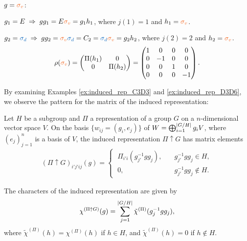 \begin{example}
\n

$g = \sv$:

$g_1 = E \implies g g_1 = E \sv = g_1 h_1$, where $j(1) = 1$ and $h_1 = \sv$.

$g_2 = \sd \implies g g_2 = \sv \sd = C_2 = \sd \sv = g_2 h_2$, where $j(2) = 2$ and $h_2 = \sv$.
\begin{equation} \label{eq:rhosv_matrix_example_inducedrep_D6}
\rho(\sv) =
\begin{pmatrix}
\Pi(h_1) & 0 \\
0 & \Pi(h_2)
\end{pmatrix}
=
\begin{pmatrix}
1 & 0  & 0 &  0 \\
0 & -1 & 0 &  0 \\
0 & 0  & 1 &  0 \\
0 & 0  & 0 & -1 \\
\end{pmatrix}.
\end{equation}

\end{example}

By examining Examples \ref{ex:induced_rep_C3D3} and \ref{ex:induced_rep_D3D6}, we observe the pattern for the matrix of the induced representation:

\begin{lemma} \label{lemma:induced_rep_matrix_i'j'ij_block}
Let $H$ be a subgroup and $\Pi$ a representation of a group $G$ on a $n$-dimensional vector space $V$. On the basis $\{w_{ij} = (g_i, e_j)\}$ of $W = \bigoplus_{i=1}^{\abs{G/H}} g_i V$, where $(e_j)_{j=1}^n$ is a basis of $V$, the induced representation $\Pi \uparrow G$ has matrix elements
\begin{align} \label{eq:induced_rep_matrix_i'j'ij_block}
(\Pi \uparrow G)_{i'j'ij}(g) =
\begin{cases}
\; \Pi_{i'i}(g_{j'}^{-1} g g_j), \quad & g_{j'}^{-1} g g_j \in H, \\
\; 0,  & g_{j'}^{-1} g g_j \notin H.
\end{cases}
\end{align}
\end{lemma}

\begin{corollary} \label{coro:character_of_induced_rep}
The characters of the induced representation are given by
\begin{equation} \label{eq:character_induced_rep}
\chi^{(\Pi \uparrow G)}(g) = \sum_{j=1}^{\abs{G/H}} \tilde{\chi}^{(\Pi)} (g_j^{-1} g g_j),
\end{equation}
where $\tilde{\chi}^{(\Pi)}(h) = \chi^{(\Pi)}(h)$ if $h \in H$, and $\tilde{\chi}^{(\Pi)}(h) = 0$ if $h \notin H$.
\end{corollary}


